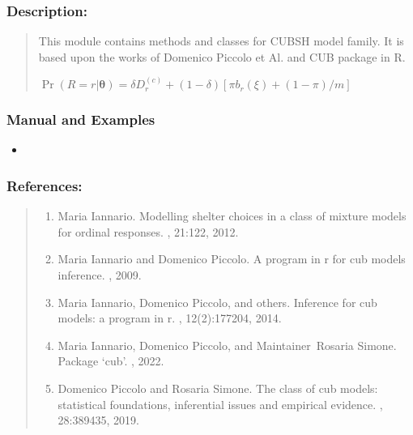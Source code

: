 \documentclass[letterpaper,10pt,english]{sphinxmanual}
\begin{document}
\subsubsection{Description:}
\label{\detokenize{cubmods:id333}}\begin{quote}

\sphinxAtStartPar
This module contains methods and classes
for CUBSH model family.
It is based upon the works of Domenico
Piccolo et Al. and CUB package in R.

\sphinxAtStartPar
\(\Pr(R=r|\pmb\theta) = \delta D_r^{(c)} + (1 - \delta)[ \pi b_r(\xi) + (1-\pi)/m ]\)
\end{quote}


\subsubsection{Manual and Examples}
\label{\detokenize{cubmods:id334}}\begin{itemize}
\item {} 
\sphinxAtStartPar
{}

\end{itemize}


\subsubsection{References:}
\label{\detokenize{cubmods:id335}}\begin{quote}
\begin{enumerate}
%
\setcounter{enumi}{0}
\item {} 
\sphinxAtStartPar
Maria Iannario. Modelling shelter choices in a class of mixture models for ordinal responses. , 21:1\textendash{}22, 2012.

\item {} 
\sphinxAtStartPar
Maria Iannario and Domenico Piccolo. A program in r for cub models inference. , 2009.

\item {} 
\sphinxAtStartPar
Maria Iannario, Domenico Piccolo, and others. Inference for cub models: a program in r. , 12(2):177\textendash{}204, 2014.

\item {} 
\sphinxAtStartPar
Maria Iannario, Domenico Piccolo, and Maintainer Rosaria Simone. Package ‘cub’. , 2022.

\item {} 
\sphinxAtStartPar
Domenico Piccolo and Rosaria Simone. The class of cub models: statistical foundations, inferential issues and empirical evidence. , 28:389\textendash{}435, 2019.

\end{enumerate}
\end{quote}
\end{document}
